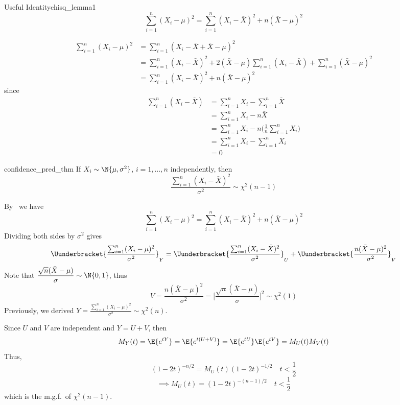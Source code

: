 \begin{Lemma}{Useful Identity}{chisq_lemma1}
    \[ \sum_{i=1}^{n} (X_i-\mu)^2=\sum_{i=1}^{n} (X_i-\bar{X})^2+n(\bar{X}-\mu)^2 \]
\end{Lemma}
\begin{Proof}{}{}
    \begin{align*}
        \sum_{i=1}^{n} (X_i-\mu)^2
         & =\sum_{i=1}^{n} (X_i-\bar{X}+\bar{X}-\mu)^2                                                               \\
         & =\sum_{i=1}^{n} (X_i-\bar{X})^2+2(\bar{X}-\mu)\sum_{i=1}^{n} (X_i-\bar{X})+\sum_{i=1}^{n} (\bar{X}-\mu)^2 \\
         & =\sum_{i=1}^{n} (X_i-\bar{X})^2+n(\bar{X}-\mu)^2
    \end{align*}
    since
    \begin{align*}
        \sum_{i=1}^{n} (X_i-\bar{X})
         & =\sum_{i=1}^{n} X_i-\sum_{i=1}^{n} \bar{X}                        \\
         & =\sum_{i=1}^{n} X_i-n\bar{X}                                      \\
         & =\sum_{i=1}^{n} X_i-n\biggl(\frac{1}{n} \sum_{i=1}^{n} X_i\biggr) \\
         & =\sum_{i=1}^{n} X_i-\sum_{i=1}^{n} X_i                            \\
         & =0
    \end{align*}
\end{Proof}
\begin{Theorem}{}{confidence_pred_thm}
    If $ X_i \sim \N{\mu,\sigma^2} $, $ i=1,\ldots,n $ independently, then
    \[ \frac{\sum_{i=1}^{n} (X_i-\bar{X})^2}{\sigma^2} \sim \chi^2(n-1)  \]
\end{Theorem}
\begin{Proof}{}{}
    By~ we have
    \[ \sum_{i=1}^{n} (X_i-\mu)^2=\sum_{i=1}^{n} (X_i-\bar{X})^2+n(\bar{X}-\mu)^2 \]
    Dividing both sides by $ \sigma^2 $ gives
    \[ \Uunderbracket{\frac{\sum_{i=1}^{n} (X_i-\mu)^2}{\sigma^2}}_{Y}
        =
        \Uunderbracket{\frac{\sum_{i=1}^{n} (X_i-\bar{X})^2}{\sigma^2}}_{U}
        +
        \Uunderbracket{\frac{n(\bar{X}-\mu)^2}{\sigma^2}}_{V}  \]
    Note that $ \displaystyle \frac{\sqrt{n}(\bar{X}-\mu)}{\sigma} \sim \N{0,1} $, thus
    \[ V=\frac{n(\bar{X}-\mu)^2}{\sigma^2}=
        \biggl[ \frac{\sqrt{n}(\bar{X}-\mu)}{\sigma} \biggr]^2 \sim \chi^2(1)  \]
    Previously, we derived $
        Y=\displaystyle \frac{\sum_{i=1}^{n} (X_i-\mu)^2}{\sigma^2}\sim \chi^2(n) $.

    Since $ U $ and $ V $ are independent and $ Y=U+V $, then
    \[ M_Y(t)=\E{e^{tY}}=\E{e^{t(U+V)}}=\E{e^{tU}}\E{e^{tV}}=M_U(t)M_V(t) \]
    Thus,
    \[ (1-2t)^{-n/2}=M_U(t)(1-2t)^{-1/2}\quad t<\frac{1}{2} \]
    \[ \implies M_U(t)=(1-2t)^{-(n-1)/2}\quad t<\frac{1}{2} \]
    which is the m.g.f.\ of $ \chi^2(n-1) $.
\end{Proof}
